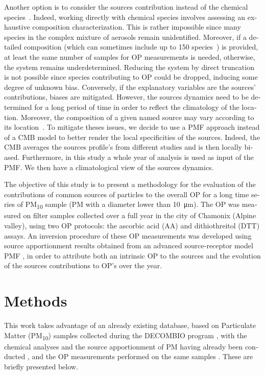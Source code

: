 \begin{otherlanguage}{english}
Another option is to consider the sources contribution instead of the chemical
species~\parencite{vermaReactive2014,batesReactive2015,fangPM22015,fangOxidative2016}.
Indeed, working directly with chemical species involves assessing an exhaustive
composition characterization. This is rather impossible since many species in
the complex mixture of aerosols remain unidentified. Moreover, if a detailed
composition (which can sometimes include up to 150
species~\parencite{wakedSource2014}) is provided, at least the same number of
samples for OP measurements is needed, otherwise, the system remains
underdetermined. Reducing the system by direct truncation is not possible since
species contributing to OP could be dropped, inducing some degree of unknown
bias. Conversely, if the explanatory variables are the sources’ contributions,
biases are mitigated.  However, the sources dynamics need to be determined for a
long period of time in order to reflect the climatology of the location.
Moreover, the composition of a given named source may vary according to its
location~\parencite{belisCritical2013}.
To mitigate theses issues, we decide to use a PMF approach instead of a CMB
model to better render the local specificities of the sources. Indeed, the CMB
averages the sources profile’s from different studies and is then locally biased.
Furthermore, in this study a whole year of analysis is used as input of the PMF.
We then have a climatological view of the sources dynamics.

The objective of this study is to present a methodology for the evaluation of
the contributions of common sources of particles to the overall OP for a long
time series of PM\textsubscript{10} sample (PM with a diameter lower than
\SI{10}{\micro\meter}). The OP was measured on filter samples collected
over a full year in the city of Chamonix (Alpine valley), using two OP
protocols: the ascorbic acid (AA) and dithiothreitol (DTT) assays. An inversion
procedure of these OP measurements was developed using source apportionment
results obtained from an advanced source-receptor model PMF
\parencite{chevrierChauffage2016}, in order to attribute both an intrinsic OP to
the sources and the evolution of the sources contributions to OP's over
the year.


\section{Methods}

This work takes advantage of an already existing database, based on Particulate
Matter (PM\textsubscript{10}) samples collected during the DECOMBIO program
\parencite{chevrier_decombio-contribution_2016}, with the chemical analyses and the
source apportionment of PM having already been conducted
\parencite{chevrierChauffage2016}, and the OP measurements performed on the
same samples \parencite{calasComparison2018}.  These are briefly presented below.



\end{otherlanguage}
